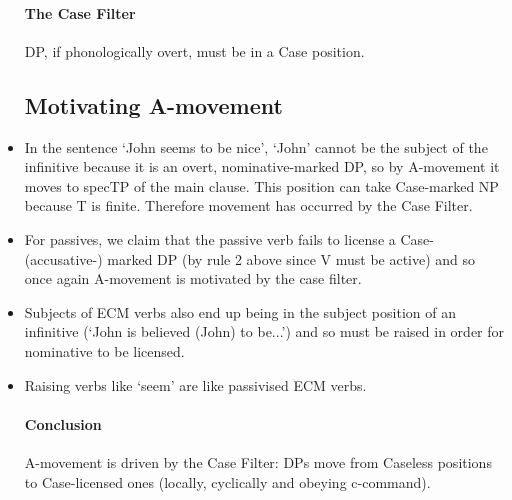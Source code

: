\documentclass{article}
\begin{document}
\begin{itemize}
    \paragraph{The Case Filter} DP, if phonologically overt, must be in a Case position.
    \subsection{Motivating A-movement}
    \item In the sentence `John seems to be nice', `John' cannot be the subject of the infinitive because it is an overt, nominative-marked DP, so by A-movement it moves to specTP of the main clause. This position can take Case-marked NP because T is finite. Therefore movement has occurred by the Case Filter.
    \item For passives, we claim that the passive verb fails to license a Case- (accusative-) marked DP (by rule 2 above since V must be active) and so once again A-movement is motivated by the case filter.
    \item Subjects of ECM verbs also end up being in the subject position of an infinitive (`John is believed (John) to be...') and so must be raised in order for nominative to be licensed.
    \item Raising verbs like `seem' are like passivised ECM verbs.
    \paragraph{Conclusion} A-movement is driven by the Case Filter: DPs move from Caseless positions to Case-licensed ones (locally, cyclically and obeying c-command).
\end{itemize}
\end{document}
